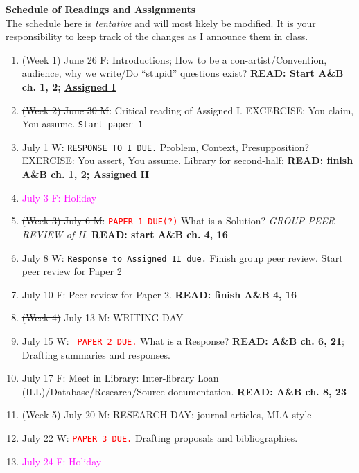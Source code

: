 \documentclass [11pt]{article}
\begin{document}
   {\bf  Schedule of Readings and Assignments}\\
   The schedule here is {\it tentative} and will most likely be modified. It is your responsibility to keep track of the changes as I announce them in class.
    \begin{enumerate}

\item \sout{(Week 1) June 26 F}:   Introductions; How to be a con-artist/Convention, audience, why we write/Do ``stupid'' questions exist? \textbf{READ: Start A\&B ch. 1, 2; \href{http://www.newyorker.com/reporting/2007/04/16/070416fa_fact_colapinto}{Assigned I}} 

\item \sout{(Week 2) June 30 M}: Critical reading of Assigned I. EXCERCISE: You claim, You assume. \texttt{Start paper 1}
\item[] July 1 W: \texttt{RESPONSE TO I DUE.} Problem, Context, Presupposition? EXERCISE: You assert, You assume. Library for second-half;  \textbf{ READ: finish A\&B ch. 1, 2; \href{http://www.llc.ilstu.edu/dlevere/docs/currentanthroarticle.web.pdf}{Assigned II}}
\item[] \textcolor{magenta}{July 3 F: Holiday} 

\item \sout{(Week 3) July 6 M}: \textcolor{red}{\texttt{PAPER 1 DUE(?)}} What is a Solution? \textsl{GROUP PEER REVIEW of II.} {\bf READ: start A\&B ch. 4, 16}   
\item[] July 8 W: \texttt{Response to Assigned II due.} Finish group peer review. Start peer review for Paper 2  
\item[] July 10 F: Peer review for Paper 2. {\bf READ: finish A\&B 4, 16}

\item \sout{(Week 4)} July 13 M: WRITING DAY
\item[] July 15 W: \textcolor{red}{\texttt{ PAPER 2 DUE.}} What is a Response? {\bf READ: A\&B ch. 6, 21}; Drafting summaries and responses. 
\item[] July 17 F: Meet in Library: Inter-library Loan (ILL)/Database/Research/Source documentation. {\bf READ: A\&B ch. 8, 23} 

\item (Week 5) July 20 M: RESEARCH DAY: journal articles, MLA style    
\item[] July 22 W: \textcolor{red}{\texttt{PAPER 3 DUE.}} Drafting proposals and bibliographies.
\item[] \textcolor{magenta}{July 24 F: Holiday}


\end{enumerate}
\end{document}
